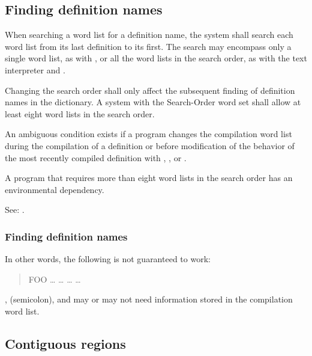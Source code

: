 \subsection{Finding definition names} %
\label{search:find}

When searching a word list for a definition name, the system shall
search each word list from its last definition to its first. The
search may encompass only a single word list, as with
, or all the word lists in the search order,
as with the text interpreter and .

Changing the search order shall only affect the subsequent finding
of definition names in the dictionary. A system with the Search-Order
word set shall allow at least eight word lists in the search order.

An ambiguous condition exists if a program changes the compilation
word list during the compilation of a definition or before
modification of the behavior of the most recently compiled definition
with , , or
.

A program that requires more than eight word lists in the search
order has an environmental dependency.

See: .

\begin{intro}
\subsubsection{Finding definition names} %

In other words, the following is not guaranteed to work:

\begin{quote}\ttfamily
	\word{:} FOO {\ldots}
		\word{[} {\ldots}  \word{]}
		{\ldots}  {\ldots} \\
	\word{;} 
\end{quote}
, \word{;} (semicolon), and  may or may
not need information stored in the compilation word list.
\end{intro}

\subsection{Contiguous regions} %

